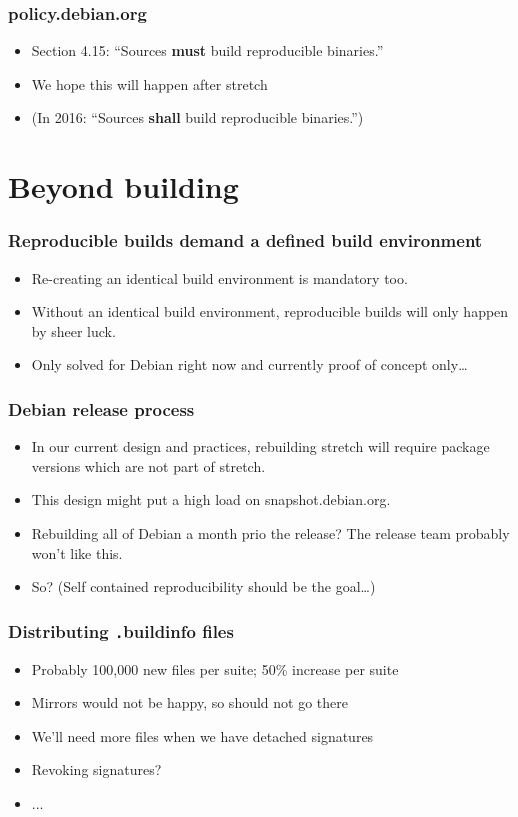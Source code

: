 \documentclass[14pt]{beamer}
\begin{document}
\begin{frame}
 \frametitle{policy.debian.org}

 \begin{itemize}
  \item Section 4.15: “Sources \textbf{must} build reproducible binaries.”
  \item<2-3> We hope this will happen after stretch
  \item<3> (In 2016: “Sources \textbf{shall} build reproducible binaries.”)
 \end{itemize}
\end{frame}

\section{Beyond building}

\begin{frame}
 \frametitle{Reproducible builds demand a defined build environment}
 \begin{itemize}
  \item Re-creating an identical build environment is mandatory too.
  \item Without an identical build environment, reproducible builds will only
  happen by sheer luck.
  \item<2>{Only solved for Debian right now and currently proof of concept only…}
 \end{itemize}
\end{frame}

\begin{frame}
 \frametitle{Debian release process}
 \begin{itemize}
  \item In our current design and practices, rebuilding stretch will require
  package versions which are not part of stretch.
  \item This design might put a high load on snapshot.debian.org.
  \item<2-3>{Rebuilding all of Debian a month prio the release? The release team probably won't like this. }
  \item<3>{So? (Self contained reproducibility should be the goal…)}
 \end{itemize}
\end{frame}

\begin{frame}
 \frametitle{Distributing \texttt .buildinfo files}
 \begin{itemize}
  \item Probably 100,000 new files per suite; 50\% increase per suite
  \item Mirrors would not be happy, so should not go there
  \item We'll need more files when we have detached signatures
  \item<2-3>{Revoking signatures?}
  \item<3>{...}
 \end{itemize}
\end{frame}
\end{document}
